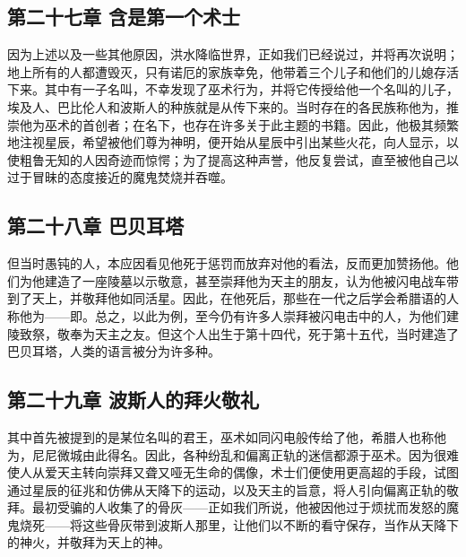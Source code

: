 
\subsection{第二十七章 含是第一个术士}

因为上述以及一些其他原因，洪水降临世界，正如我们已经说过，并将再次说明；地上所有的人都遭毁灭，只有诺厄的家族幸免，他带着三个儿子和他们的儿媳存活下来。其中有一子名叫，不幸发现了巫术行为，并将它传授给他一个名叫的儿子，埃及人、巴比伦人和波斯人的种族就是从传下来的。当时存在的各民族称他为，推崇他为巫术的首创者；在名下，也存在许多关于此主题的书籍。因此，他极其频繁地注视星辰，希望被他们尊为神明，便开始从星辰中引出某些火花，向人显示，以使粗鲁无知的人因奇迹而惊愕；为了提高这种声誉，他反复尝试，直至被他自己以过于冒昧的态度接近的魔鬼焚烧并吞噬。\par


\subsection{第二十八章 巴贝耳塔}

但当时愚钝的人，本应因看见他死于惩罚而放弃对他的看法，反而更加赞扬他。他们为他建造了一座陵墓以示敬意，甚至崇拜他为天主的朋友，认为他被闪电战车带到了天上，并敬拜他如同活星。因此，在他死后，那些在一代之后学会希腊语的人称他为——即。总之，以此为例，至今仍有许多人崇拜被闪电击中的人，为他们建陵致祭，敬奉为天主之友。但这个人出生于第十四代，死于第十五代，当时建造了巴贝耳塔，人类的语言被分为许多种。\par


\subsection{第二十九章 波斯人的拜火敬礼}

其中首先被提到的是某位名叫的君王，巫术如同闪电般传给了他，希腊人也称他为，尼尼微城由此得名。因此，各种纷乱和偏离正轨的迷信都源于巫术。因为很难使人从爱天主转向崇拜又聋又哑无生命的偶像，术士们便使用更高超的手段，试图通过星辰的征兆和仿佛从天降下的运动，以及天主的旨意，将人引向偏离正轨的敬拜。最初受骗的人收集了的骨灰——正如我们所说，他被因他过于烦扰而发怒的魔鬼烧死——将这些骨灰带到波斯人那里，让他们以不断的看守保存，当作从天降下的神火，并敬拜为天上的神。\par

